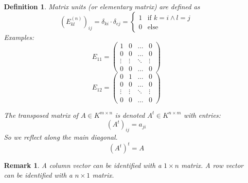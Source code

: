 \documentclass[a4paper,landscape,twocolumn]{article}
\newtheorem{defi}{Definition}
\newtheorem{rem}{Remark}
\begin{document}
\begin{defi}
  \emph{Matrix units} (or \emph{elementary matrix}) are defined as
  \[
    (E^{(n)}_{kl})_{ij} = \delta_{ki} \cdot \delta_{ej}
    = \begin{cases}
      1 & \text{if } k = i \land l = j \\
      0 & \text{else}
    \end{cases}
  \]
  Examples:
  \[
    E_{11} = \begin{pmatrix}
      1 & 0 & \ldots & 0 \\
      0 & 0 & \ldots & 0 \\
      \vdots & \vdots & \ddots & \vdots \\
      0 & 0 & \ldots & 0
    \end{pmatrix}
  \]
  \[
    E_{12} = \begin{pmatrix}
      0 & 1 & \ldots & 0 \\
      0 & 0 & \ldots & 0 \\
      \vdots & \vdots & \ddots & \vdots \\
      0 & 0 & \ldots & 0
    \end{pmatrix}
  \]

  The transposed matrix of $A \in K^{m\times n}$ is denoted
  $A^t \in K^{n\times m}$ with entries:
  \[ (A^t)_{ij} = a_{ji} \]
  So we reflect along the main diagonal.
  \[ (A^t)^t = A \]
\end{defi}
\begin{rem}
  A column vector can be identified with a $1 \times n$ matrix.
  A row vector can be identified with a $n \times 1$ matrix.
\end{rem}
\end{document}
